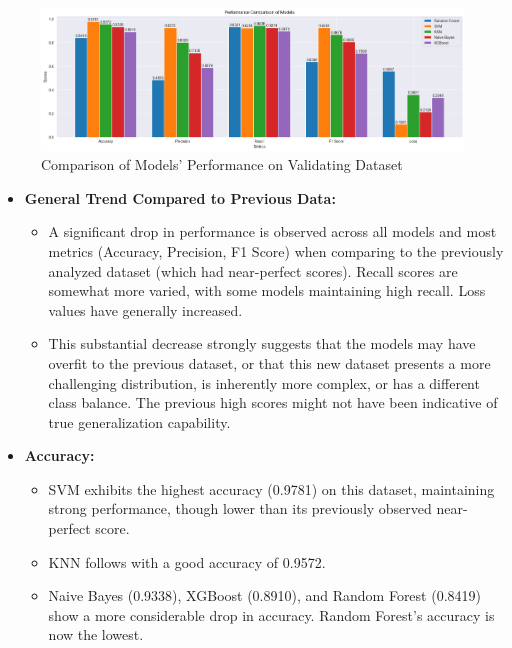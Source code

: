 \begin{figure}[H]
    \centering
    \includegraphics[width=\linewidth]{images/models_performance_validating}
    \caption{Comparison of Models' Performance on Validating Dataset}
    \label{fig:models_performance_validating}
\end{figure}

\begin{itemize}
    \item \textbf{General Trend Compared to Previous Data:}
    \begin{itemize}
        \item A significant drop in performance is observed across all models and most metrics (Accuracy, Precision, F1 Score) when comparing to the previously analyzed dataset (which had near-perfect scores). Recall scores are somewhat more varied, with some models maintaining high recall. Loss values have generally increased.
        \item This substantial decrease strongly suggests that the models may have overfit to the previous dataset, or that this new dataset presents a more challenging distribution, is inherently more complex, or has a different class balance. The previous high scores might not have been indicative of true generalization capability.
    \end{itemize}

    \item \textbf{Accuracy:}
    \begin{itemize}
        \item SVM exhibits the highest accuracy (0.9781) on this dataset, maintaining strong performance, though lower than its previously observed near-perfect score.
        \item KNN follows with a good accuracy of 0.9572.
        \item Naive Bayes (0.9338), XGBoost (0.8910), and Random Forest (0.8419) show a more considerable drop in accuracy. Random Forest's accuracy is now the lowest.
    \end{itemize}


\end{itemize}
